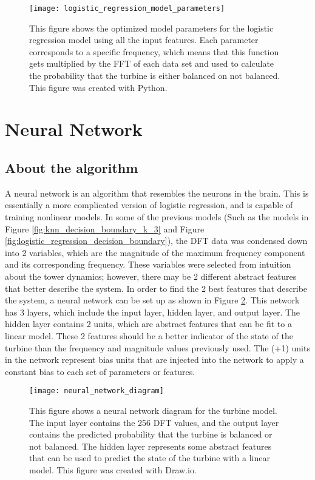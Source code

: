 \begin{figure}
	\centering
	\texttt{[image: logistic\_regression\_model\_parameters]}
	\decoRule
	\caption{This figure shows the optimized model parameters for the logistic regression model using all the input features.  Each parameter corresponds to a specific frequency, which means that this function gets multiplied by the FFT of each data set and used to calculate the probability that the turbine is either balanced on not balanced.  This figure was created with Python.}
	\label{fig:logistic_regression_model_parameters}
\end{figure}

\section{Neural Network}

\subsection{About the algorithm}
A neural network is an algorithm that resembles the neurons in the brain.  This is essentially a more complicated version of logistic regression, and is capable of training nonlinear models.  In some of the previous models (Such as the models in Figure \ref{fig:knn_decision_boundary_k_3} and Figure \ref{fig:logistic_regression_decision_boundary}), the DFT data was condensed down into 2 variables, which are the magnitude of the maximum frequency component and its corresponding frequency.  These variables were selected from intuition about the tower dynamics; however, there may be 2 different abstract features that better describe the system.  In order to find the 2 best features that describe the system, a neural network can be set up as shown in Figure \ref{fig:neural_network_diagram}.  This network has 3 layers, which include the input layer, hidden layer, and output layer.  The hidden layer contains 2 units, which are abstract features that can be fit to a linear model.  These 2 features should be a better indicator of the state of the turbine than the frequency and magnitude values previously used.  The (+1) units in the network represent bias units that are injected into the network to apply a constant bias to each set of parameters or features.

\begin{figure}
\centering
\texttt{[image: neural\_network\_diagram]}
\decoRule
\caption{This figure shows a neural network diagram for the turbine model.  The input layer contains the 256 DFT values, and the output layer contains the predicted probability that the turbine is balanced or not balanced.  The hidden layer represents some abstract features that can be used to predict the state of the turbine with a linear model.  This figure was created with Draw.io.}
\label{fig:neural_network_diagram}
\end{figure}

